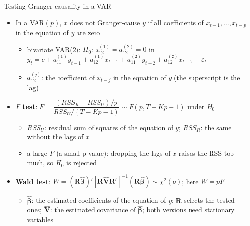 \begin{frame}{Testing Granger causality in a VAR}
\itemsize{\small}
\begin{itemize}
    \item In a VAR$(p)$, $x$ does not Granger-cause $y$ if all coefficients of $x_{t-1}, \dots, x_{t-p}$ in the equation of $y$ are zero
    \begin{itemize}
        \item bivariate VAR(2): $H_0$: $a_{12}^{(1)} = a_{12}^{(2)} = 0$ in $y_t = c + a_{11}^{(1)}y_{t-1} + a_{12}^{(1)}x_{t-1} + a_{11}^{(2)}y_{t-2} + a_{12}^{(2)}x_{t-2} + \varepsilon_t$
        \item $a_{12}^{(j)}$: the coefficient of $x_{t-j}$ in the equation of $y$ (the superscript is the lag)
    \end{itemize}
    \item \textbf{$F$ test}: $F = \dfrac{(RSS_R - RSS_U)/p}{RSS_U/(T - Kp - 1)} \sim F(p, T - Kp - 1)$ under $H_0$
    \begin{itemize}
        \item $RSS_U$: residual sum of squares of the equation of $y$; $RSS_R$: the same without the lags of $x$
        \item a large $F$ (a small p-value): dropping the lags of $x$ raises the RSS too much, so $H_0$ is rejected
    \end{itemize}
    \item \textbf{Wald test}: $W = (\mathbf{R}\hat{\boldsymbol{\beta}})'[\mathbf{R}\hat{\mathbf{V}}\mathbf{R}']^{-1}(\mathbf{R}\hat{\boldsymbol{\beta}}) \sim \chi^2(p)$; here $W = pF$
    \begin{itemize}
        \item $\hat{\boldsymbol{\beta}}$: the estimated coefficients of the equation of $y$; $\mathbf{R}$ selects the tested ones; $\hat{\mathbf{V}}$: the estimated covariance of $\hat{\boldsymbol{\beta}}$; both versions need stationary variables
    \end{itemize}
\end{itemize}
\end{frame}

